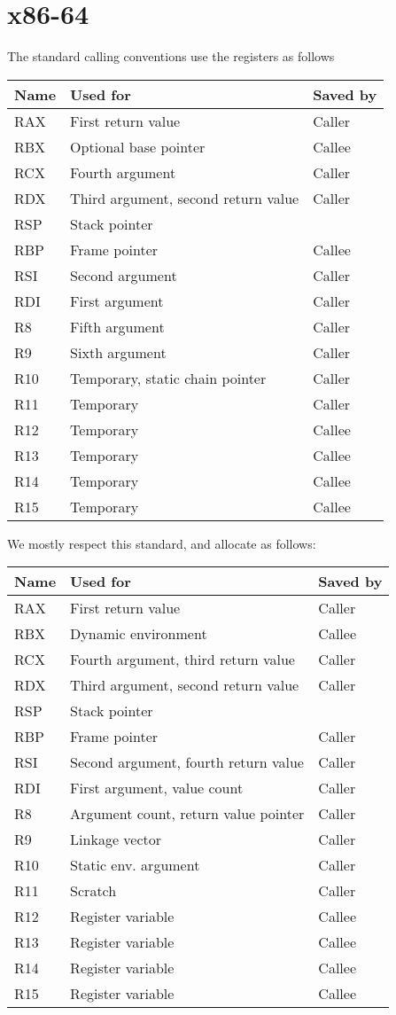 \chapter{x86-64}
\label{chapter-backend-x86-64}

The standard calling conventions use the registers as follows

\begin{tabular}{|l|l|l|}
\hline
Name & Used for & Saved by\\
\hline
\hline
RAX & First return value & Caller\\
RBX & Optional base pointer & Callee\\
RCX & Fourth argument & Caller \\
RDX & Third argument, second return value & Caller\\
RSP & Stack pointer &\\
RBP & Frame pointer & Callee\\
RSI & Second argument & Caller\\
RDI & First argument & Caller\\
R8 & Fifth argument & Caller\\
R9 & Sixth argument & Caller\\
R10 & Temporary, static chain pointer & Caller\\
R11 & Temporary & Caller\\
R12 & Temporary & Callee\\
R13 & Temporary & Callee\\
R14 & Temporary & Callee\\
R15 & Temporary & Callee\\
\hline
\end{tabular}

We mostly respect this standard, and allocate as follows:

\begin{tabular}{|l|l|l|}
\hline
Name & Used for & Saved by\\
\hline
\hline
RAX & First return value & Caller\\
RBX & Dynamic environment & Callee\\
RCX & Fourth argument, third return value & Caller \\
RDX & Third argument, second return value & Caller\\
RSP & Stack pointer &\\
RBP & Frame pointer & Caller\\
RSI & Second argument, fourth return value & Caller\\
RDI & First argument, value count & Caller\\
R8 &  Argument count, return value pointer& Caller\\
R9 & Linkage vector & Caller\\
R10 & Static env. argument & Caller\\
R11 & Scratch & Caller\\
R12 & Register variable & Callee\\
R13 & Register variable & Callee\\
R14 & Register variable & Callee\\
R15 & Register variable & Callee\\
\hline
\end{tabular}

